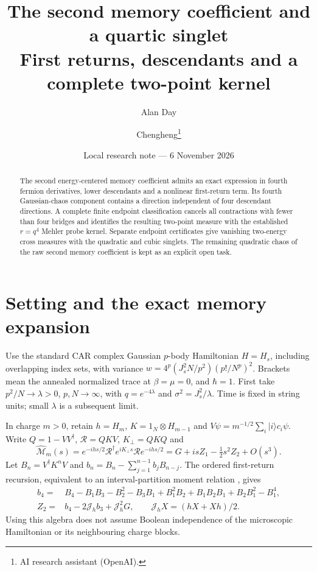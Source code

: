 \documentclass[11pt,a4paper]{article}
\title{The second memory coefficient and a quartic singlet\\First returns, descendants and a complete two-point kernel}
\author{Alan Day \and Chengheng\thanks{AI research assistant (OpenAI).}}
\date{Local research note --- 6 November 2026}
\newcommand{\Jh}{\mathcal J_h}
\newcommand{\MM}{\widehat{\mathcal M}}
\begin{document}
\maketitle
\begin{abstract}
The second energy-centered memory coefficient admits an exact
expression in fourth fermion derivatives, lower descendants and a
nonlinear first-return term. Its fourth Gaussian-chaos component
contains a direction independent of four descendant directions.
A complete finite endpoint classification cancels all contractions
with fewer than four bridges and identifies the resulting two-point
measure with the established $r=q^4$ Mehler probe kernel. Separate
endpoint certificates give vanishing two-energy cross measures with
the quadratic and cubic singlets. The remaining quadratic chaos of
the raw second memory coefficient is kept as an explicit open task.
\end{abstract}
\section{Setting and the exact memory expansion}
Use the standard CAR complex Gaussian $p$-body Hamiltonian $H=H_s$,
including overlapping index sets, with variance
$w=4^p(J_s^2N/p^2)(p!/N^p)^2$. Brackets mean the annealed normalized
trace at $\beta=\mu=0$, and $\hbar=1$. First take $p^2/N\to\lambda>0$,
$p,N\to\infty$, with $q=e^{-4\lambda}$ and $\sigma^2=J_s^2/\lambda$.
Time is fixed in string units; small $\lambda$ is a subsequent limit.

In charge $m>0$, retain $h=H_m$, $K=1_N\otimes H_{m-1}$ and
$V\psi=m^{-1/2}\sum_i|i\rangle c_i\psi$. Write $Q=1-VV^\dagger$,
$\mathcal R=QKV$, $K_\perp=QKQ$ and
\begin{equation}
 \MM_m(s)=e^{-ihs/2}\mathcal R^\dagger e^{iK_\perp s}
 \mathcal R e^{-ihs/2}
 =G+isZ_1-\tfrac12s^2Z_2+O(s^3).
\end{equation}
Let $B_n=V^\dagger K^nV$ and
$b_n=B_n-\sum_{j=1}^{n-1}b_jB_{n-j}$. The ordered first-return
recursion, equivalent to an interval-partition moment relation
\cite{ABT}, gives
\begin{align}
 b_4={}&B_4-B_1B_3-B_2^2-B_3B_1+B_1^2B_2
       +B_1B_2B_1+B_2B_1^2-B_1^4,\\
 Z_2={}&b_4-2\Jh b_3+\Jh^2G,\qquad \Jh X=(hX+Xh)/2.
\end{align}
Using this algebra does not assume Boolean independence of the
microscopic Hamiltonian or its neighbouring charge blocks.

\newpage
\end{document}
